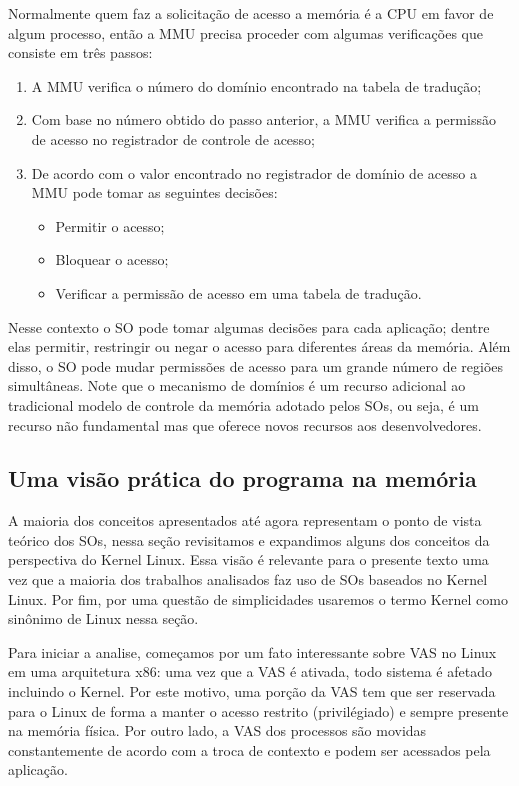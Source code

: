 Normalmente quem faz a solicitação de acesso a memória é a CPU em favor de
algum processo, então a MMU precisa proceder com algumas verificações que
consiste em três passos:

\begin{enumerate}
  \item A MMU verifica o número do domínio encontrado na tabela de tradução;
  \item Com base no número obtido do passo anterior, a MMU verifica a permissão
        de acesso no registrador de controle de acesso;
  \item De acordo com o valor encontrado no registrador de domínio de acesso a
        MMU pode tomar as seguintes decisões:
  \begin{itemize}
    \item Permitir o acesso;
    \item Bloquear o acesso;
    \item Verificar a permissão de acesso em uma tabela de tradução.
  \end{itemize}
\end{enumerate}

Nesse contexto o SO pode tomar algumas decisões para cada aplicação; dentre
elas permitir, restringir ou negar o acesso para diferentes áreas da memória.
Além disso, o SO pode mudar permissões de acesso para um grande número de
regiões simultâneas. Note que o mecanismo de domínios é um recurso adicional
ao tradicional modelo de controle da memória adotado pelos SOs, ou seja, é
um recurso não fundamental mas que oferece novos recursos aos desenvolvedores.

\subsection{Uma visão prática do programa na memória}
\label{sec:visao_pratica_mem}

A maioria dos conceitos apresentados até agora representam o ponto de vista
teórico dos SOs, nessa seção revisitamos e expandimos alguns dos conceitos da
perspectiva do Kernel Linux. Essa visão é relevante para o presente texto uma
vez que a maioria dos trabalhos analisados faz uso de SOs baseados no Kernel
Linux. Por fim, por uma questão de simplicidades usaremos o termo Kernel como
sinônimo de Linux nessa seção.

Para iniciar a analise, começamos por um fato interessante sobre VAS no Linux
em uma arquitetura x86: uma vez que a VAS é ativada, todo sistema é afetado
incluindo o Kernel. Por este motivo, uma porção da VAS tem que ser reservada
para o Linux de forma a manter o acesso restrito (privilégiado) e sempre
presente na memória física. Por outro lado, a VAS dos processos são movidas
constantemente de acordo com a troca de contexto e podem ser acessados pela
aplicação.

